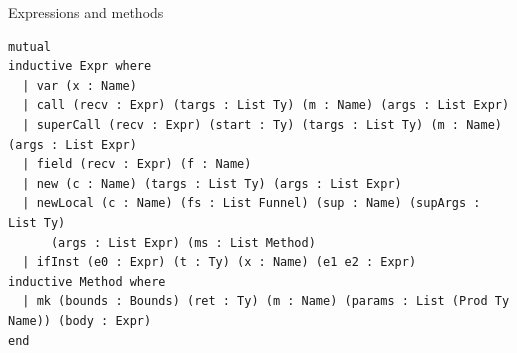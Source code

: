\begin{cmp}{Expressions and methods}
\begin{paperside}
\end{paperside}
\begin{leanside}
\begin{lstlisting}[style=leanside]
mutual
inductive Expr where
  | var (x : Name)
  | call (recv : Expr) (targs : List Ty) (m : Name) (args : List Expr)
  | superCall (recv : Expr) (start : Ty) (targs : List Ty) (m : Name) (args : List Expr)
  | field (recv : Expr) (f : Name)
  | new (c : Name) (targs : List Ty) (args : List Expr)
  | newLocal (c : Name) (fs : List Funnel) (sup : Name) (supArgs : List Ty)
      (args : List Expr) (ms : List Method)
  | ifInst (e0 : Expr) (t : Ty) (x : Name) (e1 e2 : Expr)
inductive Method where
  | mk (bounds : Bounds) (ret : Ty) (m : Name) (params : List (Prod Ty Name)) (body : Expr)
end
\end{lstlisting}
\end{leanside}
\end{cmp}

